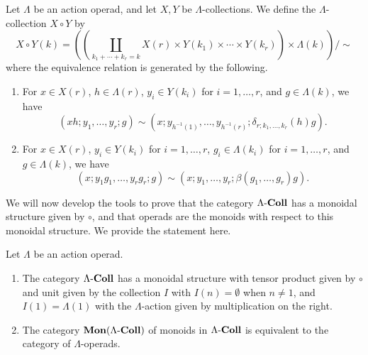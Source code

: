 \begin{Defi}\label{Defi:sub-prod}
Let $\Lambda$ be an action operad, and let $X, Y$ be $\Lambda$-collections. We define the $\Lambda$-collection $X \circ Y$ by
  \[
    X \circ Y (k) = \left(\left( \coprod_{k_{1} + \cdots + k_{r} = k} X(r) \times Y(k_{1}) \times \cdots \times Y(k_{r}) \right) \times \Lambda(k)\right) / \sim
  \]
where the equivalence relation is generated by the following.
\begin{enumerate}
\item For $x \in X(r)$, $h \in \Lambda(r)$, $y_i \in Y(k_i)$ for $i = 1, \ldots, r$, and $g \in \Lambda(k)$, we have
\[
 \left(xh; y_{1}, \ldots, y_{r}; g\right) \sim \left(x; y_{h^{-1}(1)}, \ldots, y_{h^{-1}(r)}; \delta_{r; k_1, \ldots, k_r}(h)g\right).
\]
\item For $x \in X(r)$, $y_{i} \in Y(k_{i})$ for $i = 1, \ldots, r$, $g_{i} \in \Lambda(k_{i})$  for $i = 1, \ldots, r$, and $g \in \Lambda(k)$, we have
\[
 \left(x; y_{1}g_{1}, \ldots, y_{r}g_{r}; g\right) \sim \left(x; y_{1}, \ldots, y_{r}; \beta(g_{1}, \ldots, g_{r})g\right).
\]
\end{enumerate}
%   
\end{Defi}


We will now develop the tools to prove that the category $\Lambda\mathbf{\mbox{-}Coll}$ has a monoidal structure given by $\circ$, and that operads are the monoids with respect to this monoidal structure.
We provide the statement here.

\begin{thm}\label{thm:operad=monoid}
Let $\Lambda$ be an action operad.
  \begin{enumerate}
    \item The category $\Lambda\mathbf{\mbox{-}Coll}$ has a monoidal structure with tensor product given by $\circ$ and unit given by the collection $I$ with $I(n) = \emptyset$ when $n \neq 1$, and $I(1) = \Lambda(1)$ with the $\Lambda$-action given by multiplication on the right.
    \item The category $\mathbf{Mon}(\Lambda\mathbf{\mbox{-}Coll})$ of monoids in $\Lambda\mathbf{\mbox{-}Coll}$ is equivalent to the category of $\Lambda$-operads.
  \end{enumerate}
\end{thm}

